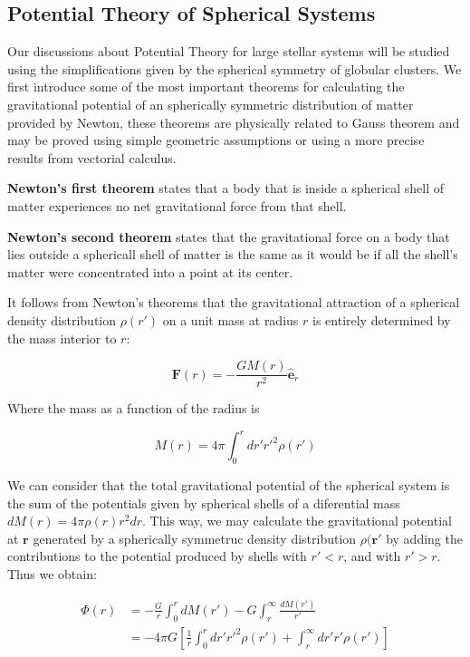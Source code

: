\subsection{Potential Theory of Spherical Systems}

Our discussions about Potential Theory for large stellar systems will be studied using the simplifications given by the spherical symmetry of globular clusters. We first introduce some of the most important theorems for calculating the gravitational potential of an spherically symmetric distribution of matter provided by Newton, these theorems are physically related to Gauss theorem and may be proved using simple geometric assumptions or using a more precise results from vectorial calculus.

\textbf{Newton's first theorem} states that a body that is inside a spherical shell of matter experiences no net gravitational force from that shell. 

\textbf{Newton's second theorem} states that the gravitational force on a body that lies outside a sphericall shell of matter is the same as it would be if all the shell's matter were concentrated into a point at its center. 

It follows from Newton's theorems that the gravitational attraction of a spherical density distribution $\rho(r')$ on a unit mass at radius $r$ is entirely determined by the mass interior to $r$:

\begin{equation}
\textbf{F}(r)=-\frac{GM(r)}{r^{2}}\hat{\textbf{e}}_{r}
\end{equation}

Where the mass as a function of the radius is

\begin{equation}
M(r)=4\pi\int_{0}^{r}dr'r'^{2}\rho(r')
\end{equation}

We can consider that the total gravitational potential of the spherical system is the sum of the potentials given by spherical shells of a diferential mass $dM(r)=4\pi\rho(r)r^{2}dr$. This way, we may calculate the gravitational potential at $\textbf{r}$ generated by a spherically symmetruc density distribution $\rho(\textbf{r}'$ by adding the contributions to the potential produced by shells with $r'<r$, and with $r'>r$. Thus we obtain:

\begin{equation}
	\begin{aligned}	
	\Phi(r) &= -\frac{G}{r}\int_{0}^{r}dM(r')-G\int_{r}^{\infty}\frac{dM(r')} {r'}\\      &= -4\pi G\left[\frac{1}{r}\int_{0}^{r}dr'r'^{2}\rho(r')+\int_{r}^{\infty}dr'r'\rho(r')\right]
	\end{aligned}
\end{equation} 

